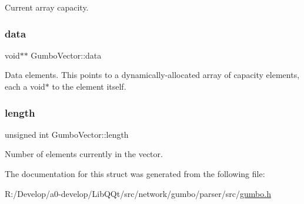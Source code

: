 Current array capacity. \mbox{\label{struct_gumbo_vector_a161ea3bf7f915fae8350edded5149a92}} 
\subsubsection{\texorpdfstring{data}{data}}
{\footnotesize\ttfamily void$\ast$$\ast$ Gumbo\+Vector\+::data}

Data elements. This points to a dynamically-\/allocated array of capacity elements, each a void$\ast$ to the element itself. \mbox{\label{struct_gumbo_vector_abc3aae0896f142d245cfe29c94dbdf66}} 
\subsubsection{\texorpdfstring{length}{length}}
{\footnotesize\ttfamily unsigned int Gumbo\+Vector\+::length}

Number of elements currently in the vector. 

The documentation for this struct was generated from the following file\+:\begin{DoxyCompactItemize}
\item 
R\+:/\+Develop/a0-\/develop/\+Lib\+Q\+Qt/src/network/gumbo/parser/src/\mbox{\hyperlink{gumbo_8h}{gumbo.\+h}}\end{DoxyCompactItemize}

